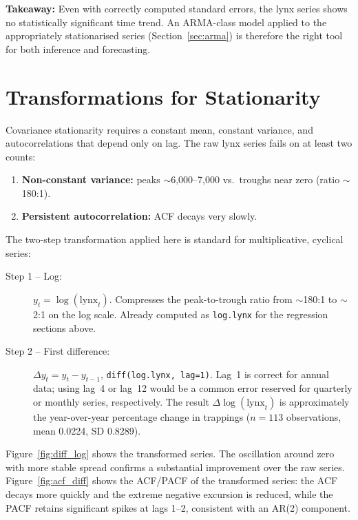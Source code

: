 \documentclass[12pt,a4paper]{article}
\begin{document}
\noindent\textbf{Takeaway:} Even with correctly computed standard errors, the lynx
series shows no statistically significant time trend. An ARMA-class model applied to
the appropriately stationarised series (Section~\ref{sec:arma}) is therefore the
right tool for both inference and forecasting.

\section{Transformations for Stationarity}
\label{sec:transform}

Covariance stationarity requires a constant mean, constant variance, and
autocorrelations that depend only on lag. The raw lynx series fails on at least two
counts:
\begin{enumerate}
  \item \textbf{Non-constant variance:} peaks $\sim$6,000--7,000 vs.\ troughs near
        zero (ratio $\sim$180:1).
  \item \textbf{Persistent autocorrelation:} ACF decays very slowly.
\end{enumerate}

The two-step transformation applied here is standard for multiplicative, cyclical
series:

\begin{description}
  \item[Step 1 -- Log:] $y_t = \log(\text{lynx}_t)$. Compresses the peak-to-trough
  ratio from $\sim$180:1 to $\sim$2:1 on the log scale. Already computed as
  \texttt{log.lynx} for the regression sections above.

  \item[Step 2 -- First difference:] $\Delta y_t = y_t - y_{t-1}$, \texttt{diff(log.lynx, lag=1)}.
  Lag~1 is correct for annual data; using lag~4 or lag~12 would be a common
  error reserved for quarterly or monthly series, respectively. The result
  $\Delta\log(\text{lynx}_t)$ is approximately the year-over-year percentage
  change in trappings ($n = 113$ observations, mean 0.0224, SD 0.8289).
\end{description}

Figure~\ref{fig:diff_log} shows the transformed series. The oscillation around zero
with more stable spread confirms a substantial improvement over the raw series.
Figure~\ref{fig:acf_diff} shows the ACF/PACF of the transformed series: the ACF
decays more quickly and the extreme negative excursion is reduced, while the PACF
retains significant spikes at lags 1--2, consistent with an AR(2) component.
\end{document}
